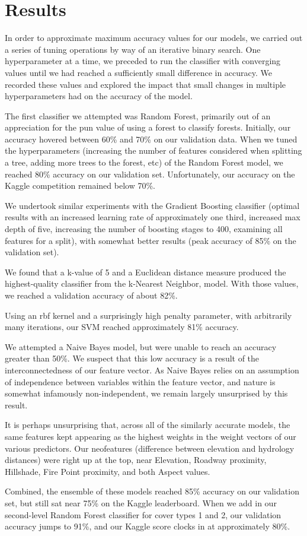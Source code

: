 \section{Results}
\label{sec:-res}
In order to approximate maximum accuracy values for our models, we 
carried out a series of tuning operations by way of an iterative binary 
search.  One hyperparameter at a time, we preceded to run the 
classifier with converging values until we had reached a sufficiently 
small difference in accuracy.  We recorded these values and explored 
the impact that small changes in multiple hyperparameters had on the 
accuracy of the model.  


The first classifier we attempted was Random Forest, primarily out of an 
appreciation for the pun value of using a forest to classify forests. 
Initially, our accuracy hovered between 60\% and 70\% on our validation 
data.  When we tuned the hyperparameters (increasing the number of 
features considered when splitting a tree, adding more trees to the 
forest, etc) of the Random Forest model, we reached 80\% accuracy on 
our validation set.  Unfortunately, our accuracy on the Kaggle 
competition remained below 70\%.  

We undertook similar experiments with the Gradient Boosting classifier 
(optimal results with an increased learning rate of approximately one 
third, increased max depth of five, increasing the number of boosting 
stages to 400, examining all features for a split), with somewhat 
better results (peak accuracy of 85\% on the validation set).  

We found that a k-value of 5 and a Euclidean distance measure
produced the highest-quality classifier from the k-Nearest Neighbor, 
model.  With those values, we reached a validation accuracy of about 
82\%.

Using an rbf kernel and a surprisingly high penalty parameter, with 
arbitrarily many iterations, our SVM reached approximately 81\% 
accuracy.

We attempted a Naive Bayes model, but were unable to reach an accuracy 
greater than 50\%.  We suspect that this low accuracy is a result of 
the interconnectedness of our feature vector.  As Naive Bayes relies on 
an assumption of independence between variables within the feature 
vector, and nature is somewhat infamously non-independent\cite{silent}, 
we remain largely unsurprised by this result.

It is perhaps unsurprising that, across all of the similarly accurate 
models, the same features kept appearing as the highest weights in the 
weight vectors of our various predictors.  Our neofeatures (difference 
between elevation and hydrology distances) were right up at the top, 
near Elevation, Roadway proximity, Hillshade, Fire Point proximity, and 
both Aspect values.

Combined, the ensemble of these models reached 85\% accuracy on our 
validation set, but still sat near 75\% on the Kaggle leaderboard.  
When we add in our second-level Random Forest classifier for cover 
types 1 and 2, our validation accuracy jumps to 91\%, and our Kaggle 
score clocks in at approximately 80\%.



